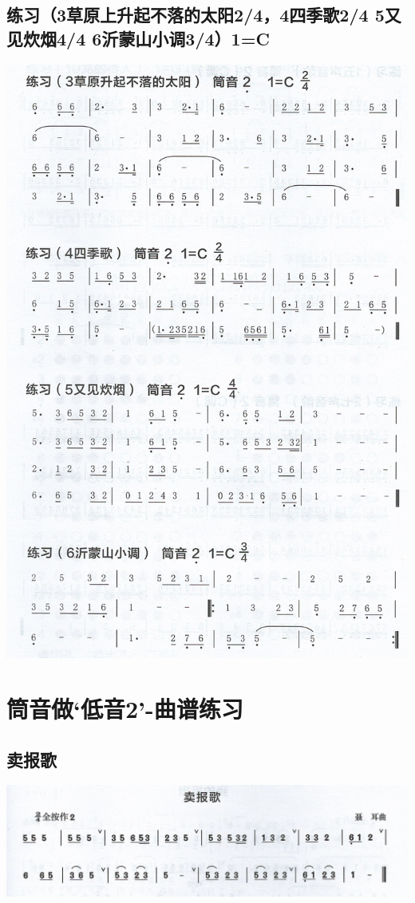 \documentclass[cn,pad,chinese,chinesefont=nofont]{elegantbook}
\begin{document}
\section{练习（3草原上升起不落的太阳2/4，4四季歌2/4 5又见炊烟4/4 6沂蒙山小调3/4）1=C}
\includegraphics[height=0.9\textheight]{dongxiao/Scan 6.jpeg}

\chapter{筒音做‘低音2’-曲谱练习}

\section{卖报歌}
	\includegraphics[width=\textwidth]{dongxiao/Scan 18-1.jpeg}
\end{document}
